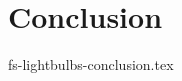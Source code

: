 \documentclass{vldb}
\begin{document}



\section {Conclusion}
 {fs-lightbulbs-conclusion.tex}



\end{document}
